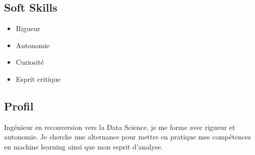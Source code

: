 \documentclass[a4paper,12pt]{article}
\newcommand{\sectionrule}[1]{%
  \section*{#1}%
  \vspace{-1em}%
  {\color{bleufonce}\noindent\rule{\linewidth}{1pt}}%
  \vspace{0.5em}%
}
\begin{document}
\begin{paracol}{2}
\begin{leftcolumn}
\begin{minipage}[t][\dimexpr\textheight - 9em\relax][t]{\dimexpr\linewidth}
{    \vspace{1em}
    \section*{Soft Skills}
    \begin{itemize}[leftmargin=1em, nosep]
      \item Rigueur
      \item Autonomie
      \item Curiosité
      \item Esprit critique
    \end{itemize}


    } %
  \end{minipage}
\end{leftcolumn}

\begin{rightcolumn}
\begin{minipage}[t][\dimexpr\textheight - 9em\relax][t]{\dimexpr\linewidth - 1.5em\relax}
  \hspace*{1.5em}
  \parbox{\dimexpr\linewidth - 1.5em\relax}{

  \section*{Profil}
  Ingénieur en reconversion vers la Data Science, je me forme avec rigueur et autonomie.
  Je cherche une alternance pour mettre en pratique mes compétences en machine learning ainsi que mon esprit d’analyse.

  \vspace{0.5em}

}
\end{minipage}
\end{rightcolumn}
\end{paracol}
\end{document}
